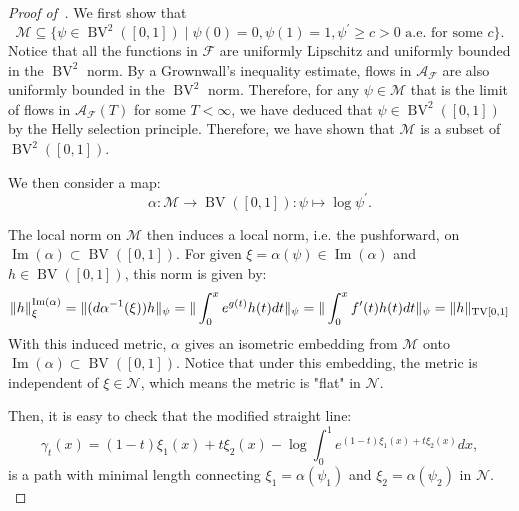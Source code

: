 \documentclass[12pt]{amsart}
\numberwithin{equation}{section}
\theoremstyle{remark}
\begin{document}
\begin{proof}[Proof of~]
    We first show that
    \begin{equation}
            \mathcal M \subseteq \{\psi\in \operatorname{BV}^2([0,1]) \mid \psi(0)=0, \psi(1) =1,  \psi^\prime \ge c > 0 \text{ a.e.}\text{ for some } c\}.
    \end{equation}
Notice that all the functions in $\mathcal F$ are uniformly Lipschitz
and uniformly bounded in the $\operatorname{BV}^2$ norm. By a Grownwall's inequality estimate, flows in $\mathcal A_{\mathcal F}$ are also uniformly bounded in the $\operatorname{BV}^2$ norm. Therefore, for any $\psi\in \mathcal M$ that is the limit of flows in $\mathcal A_{\mathcal F}(T)$ for some $T<\infty$, we have deduced that $\psi \in \operatorname{BV}^2([0,1])$ by the Helly selection principle.
Therefore, we have shown that $\mathcal M$ is a subset of $\operatorname{BV}^2([0,1])$.

We then consider a map:
\begin{equation}
    \label{eq:map_alpha}
    \alpha:\mathcal M\to \operatorname{BV}([0,1]): \psi\mapsto \log \psi^\prime.
\end{equation}

    The local norm on $\mathcal M$ then induces a local norm, i.e. the pushforward, on $\operatorname{Im}(\alpha)\subset \operatorname{BV}([0,1])$. For given $\xi = \alpha(\psi)\in \operatorname{Im}(\alpha)$ and $h\in \operatorname{BV}([0,1])$, this norm is given by:
\begin{equation}
           \|h\|_\xi^{\operatorname{Im}(\alpha)} = \|(d \alpha^{-1}(\xi))h\|_{\psi} = \|\int_0^x e^{g(t)}h(t)dt\|_{\psi}\\ = \|\int_0^x f^\prime(t) h(t)dt\|_{\psi}\\  = \|h\|_{\operatorname{TV}[0,1]}
\end{equation}
With this induced metric, $\alpha$ gives an isometric embedding from $\mathcal M$ onto $\operatorname{Im}(\alpha)\subset \operatorname{BV}([0,1])$. Notice that under this embedding, the metric is independent of $\xi\in \mathcal N$, which means the metric is "flat" in $\mathcal N$.

Then, it is easy to check that the modified straight line:
\begin{equation}
        \gamma_t(x)= (1-t)\xi_1(x)+t\xi_2(x) - \log \int_0^1 e^{(1-t)\xi_1(x)+t\xi_2(x)} dx,
\end{equation}
is a path with minimal length connecting $\xi_1=\alpha(\psi_1)$ and $\xi_2=\alpha(\psi_2)$ in $\mathcal N.$


\end{proof}
\end{document}
